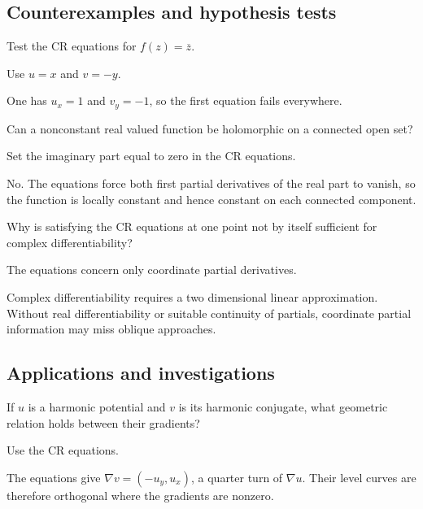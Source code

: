 \subsection*{Counterexamples and hypothesis tests}

\begin{exercise}[Conjugation]\label{exr:iv02-expand-10}
Test the CR equations for \(f(z)=\overline z\).
\end{exercise}
\begin{hint}
Use \(u=x\) and \(v=-y\).
\end{hint}
\begin{solution}
One has \(u_x=1\) and \(v_y=-1\), so the first equation fails everywhere.
\end{solution}

\begin{exercise}\label{exr:iv02-expand-11}
Can a nonconstant real valued function be holomorphic on a connected open set?
\end{exercise}
\begin{hint}
Set the imaginary part equal to zero in the CR equations.
\end{hint}
\begin{solution}
No. The equations force both first partial derivatives of the real part to vanish, so the function is locally constant and hence constant on each connected component.
\end{solution}

\begin{exercise}[Pointwise CR]\label{exr:iv02-expand-12}
Why is satisfying the CR equations at one point not by itself sufficient for complex differentiability?
\end{exercise}
\begin{hint}
The equations concern only coordinate partial derivatives.
\end{hint}
\begin{solution}
Complex differentiability requires a two dimensional linear approximation. Without real differentiability or suitable continuity of partials, coordinate partial information may miss oblique approaches.
\end{solution}

\subsection*{Applications and investigations}

\begin{exercise}\label{exr:iv02-expand-13}
If \(u\) is a harmonic potential and \(v\) is its harmonic conjugate, what geometric relation holds between their gradients?
\end{exercise}
\begin{hint}
Use the CR equations.
\end{hint}
\begin{solution}
The equations give \(\nabla v=(-u_y,u_x)\), a quarter turn of \(\nabla u\). Their level curves are therefore orthogonal where the gradients are nonzero.
\end{solution}

